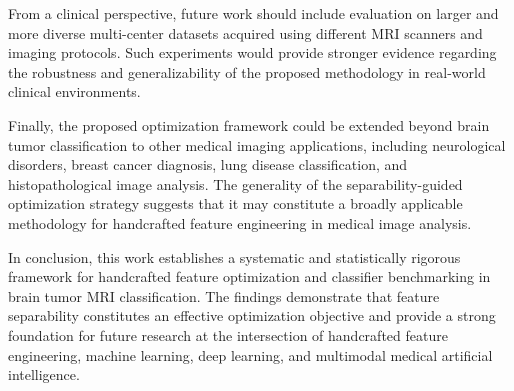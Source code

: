 From a clinical perspective, future work should include evaluation on larger and
more diverse multi-center datasets acquired using different MRI scanners and imaging
protocols. Such experiments would provide stronger evidence regarding the
robustness and generalizability of the proposed methodology in real-world clinical
environments.

Finally, the proposed optimization framework could be extended beyond brain tumor
classification to other medical imaging applications, including neurological
disorders, breast cancer diagnosis, lung disease classification, and
histopathological image analysis. The generality of the separability-guided
optimization strategy suggests that it may constitute a broadly applicable
methodology for handcrafted feature engineering in medical image analysis.

In conclusion, this work establishes a systematic and statistically rigorous
framework for handcrafted feature optimization and classifier benchmarking in brain
tumor MRI classification. The findings demonstrate that feature separability
constitutes an effective optimization objective and provide a strong foundation
for future research at the intersection of handcrafted feature engineering, machine
learning, deep learning, and multimodal medical artificial intelligence.
